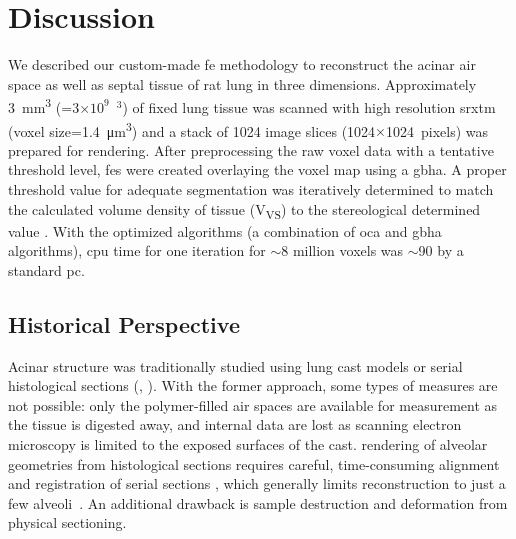\section{Discussion}\label{sec:discussion}
We described our custom-made \ac{fe} methodology to reconstruct the acinar air space as well as septal tissue of rat lung in three dimensions. Approximately \SI{3}{\milli\meter\cubed} (=3$\times10^9$~\micro\meter$^3$) of fixed lung tissue was scanned with high resolution \ac{srxtm} (voxel size=\SI{1.4}{\micro\meter\cubed}) and a stack of 1024 image slices (1024$\times$1024~pixels) was prepared for \threed rendering. After preprocessing the raw voxel data with a tentative threshold level, \threed \acp{fe} were created overlaying the voxel map using a \ac{gbha}. A proper threshold value for adequate segmentation was iteratively determined to match the calculated volume density of tissue (V\textsubscript{VS}) to the stereological determined value \cite{Tschanz2003}. With the optimized algorithms (a combination of \ac{oca} and \ac{gbha} algorithms), \acs{cpu} time for one iteration for $\sim$8 million voxels was $\sim$\SI{90}{\min} by a standard \acs{pc}.

\subsection{Historical Perspective}
Acinar structure was traditionally studied using lung cast models \cite{Boyden1971,Haefeli1988,Schreider1981} or serial histological sections (\eg, \cite{Berend1991,Hansen1975,Hansen1975a,Parker1971,Randell1989}). With the former approach, some types of measures are not possible: only the polymer-filled air spaces are available for measurement as the tissue is digested away, and internal data are lost as scanning electron microscopy is limited to the exposed surfaces of the cast. \threed rendering of alveolar geometries from histological sections requires careful, time-consuming alignment and registration of serial \twod sections \cite{Mercer1987,Mercer1987a,Stelter1966}, which generally limits reconstruction to just a few alveoli~\cite{Mercer1987}. An additional drawback is sample destruction and deformation from physical sectioning.


